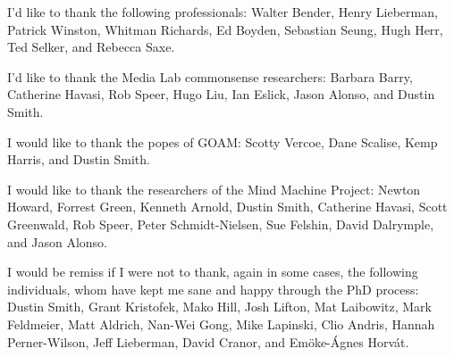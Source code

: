 \vspace{5mm}

\noindent I'd like to thank the following professionals:
Walter Bender,
Henry Lieberman,
Patrick Winston,
Whitman Richards,
Ed Boyden,
Sebastian Seung,
Hugh Herr,
Ted Selker, and
Rebecca Saxe.

\vspace{5mm}

\noindent I'd like to thank the Media Lab commonsense researchers:
Barbara Barry,
Catherine Havasi,
Rob Speer,
Hugo Liu,
Ian Eslick,
Jason Alonso, and
Dustin Smith.

\vspace{5mm}

\noindent I would like to thank the popes of GOAM:
Scotty Vercoe,
Dane Scalise,
Kemp Harris, and
Dustin Smith.

\vspace{5mm}

\noindent I would like to thank the researchers of the Mind Machine Project:
Newton Howard, Forrest Green, Kenneth Arnold, Dustin Smith, Catherine Havasi, Scott Greenwald, Rob Speer, Peter Schmidt-Nielsen, Sue Felshin, David Dalrymple, and Jason Alonso.

\vspace{5mm}

\noindent I would be remiss if I were not to thank, again in some cases, the following individuals,
whom have kept me sane and happy through the PhD process:
Dustin Smith, %
Grant Kristofek, %
Mako Hill, %
Josh Lifton, %
Mat Laibowitz, %
Mark Feldmeier, %
Matt Aldrich, %
Nan-Wei Gong, %
Mike Lapinski, %
Clio Andris, %
Hannah Perner-Wilson, %
Jeff Lieberman, %
David Cranor, and %
Em\"{o}ke-\'{A}gnes Horv\'{a}t. %

\endgroup

